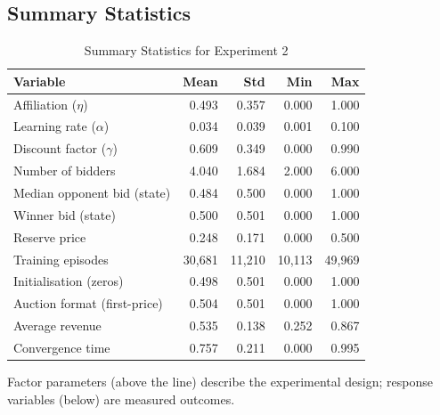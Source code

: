 \subsection{Summary Statistics}
\begin{table}[H]
\centering
\caption{Summary Statistics for Experiment 2}
\label{tab:summary_statistics_exp2}
\small
\begin{tabular}{lrrrr}
\toprule
\textbf{Variable} & \textbf{Mean} & \textbf{Std} & \textbf{Min} & \textbf{Max} \\
\midrule
Affiliation ($\eta$) & 0.493 & 0.357 & 0.000 & 1.000 \\
Learning rate ($\alpha$) & 0.034 & 0.039 & 0.001 & 0.100 \\
Discount factor ($\gamma$) & 0.609 & 0.349 & 0.000 & 0.990 \\
Number of bidders & 4.040 & 1.684 & 2.000 & 6.000 \\
Median opponent bid (state) & 0.484 & 0.500 & 0.000 & 1.000 \\
Winner bid (state) & 0.500 & 0.501 & 0.000 & 1.000 \\
Reserve price & 0.248 & 0.171 & 0.000 & 0.500 \\
Training episodes & 30{,}681 & 11{,}210 & 10{,}113 & 49{,}969 \\
Initialisation (zeros) & 0.498 & 0.501 & 0.000 & 1.000 \\
Auction format (first-price) & 0.504 & 0.501 & 0.000 & 1.000 \\
\midrule
Average revenue & 0.535 & 0.138 & 0.252 & 0.867 \\
Convergence time & 0.757 & 0.211 & 0.000 & 0.995 \\
\bottomrule
\end{tabular}
\par\smallskip\footnotesize
Factor parameters (above the line) describe the experimental design; response variables (below) are measured outcomes.
\end{table}
